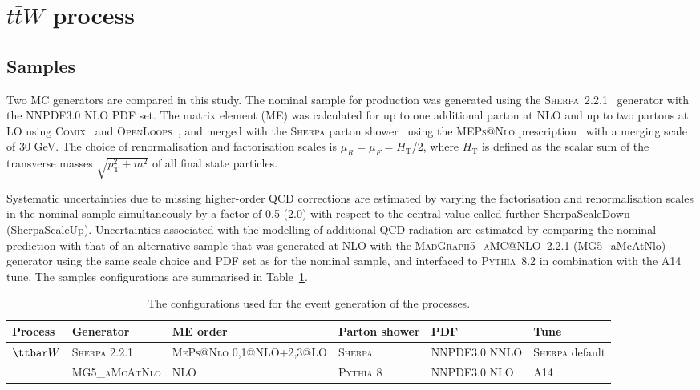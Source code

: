 \section{$t\bar{t}W$ process}
\label{sec:ttV}


\subsection{Samples}
Two MC generators are compared in this study.
The nominal sample for \ttW production was generated using the \textsc{Sherpa}~2.2.1~\cite{sherpa} generator with the NNPDF3.0 NLO PDF set. %
The matrix element (ME) was calculated for up to one additional parton at NLO and up to two partons at LO using
\textsc{Comix}~\cite{Gleisberg:2008fv} and \textsc{OpenLoops}~\cite{Cascioli:2011va}, and merged with the \textsc{Sherpa} parton shower~\cite{Schumann:2007mg} using the \textsc{MEPs@Nlo} prescription~\cite{Hoeche:2012yf} with a merging scale of 30 GeV.
The choice of renormalisation and factorisation scales is $\mu_R = \mu_F = H_\textrm{T}$/2, where $H_\textrm{T}$ is defined as the scalar sum of the transverse masses $\sqrt{p_\textrm{T}^2+m^2}$ of all final state particles.



Systematic uncertainties due to missing higher-order QCD corrections are estimated by varying the factorisation and renormalisation scales in the nominal sample simultaneously by a factor of 0.5 (2.0) with respect to the central value called further SherpaScaleDown (SherpaScaleUp). %
Uncertainties associated with the modelling of additional QCD radiation are estimated by comparing the nominal \ttW prediction with that of an alternative sample that was generated at NLO with the \textsc{MadGraph5\_aMC@NLO}~2.2.1 (MG5\_aMcAtNlo) generator using the same scale choice and PDF set as for the nominal sample, and interfaced to \textsc{Pythia}~8.2 in combination with the A14 tune. 
The samples configurations are summarised in Table~\ref{tab:mcconfig}.
\begin{table}
\begin{center}
\caption{\label{tab:mcconfig}
The configurations used for the event generation of the \ttW processes.}
\vspace{0.25cm}
{\small
\setlength\tabcolsep{1.5pt}
\begin{tabular}{llllll}
\hline\hline
Process & Generator & ME order & Parton shower & PDF & Tune  \\
\hline
$\ttbar W$  & \textsc{Sherpa 2.2.1} & \textsc{MePs@Nlo} 0,1@NLO+2,3@LO & \textsc{Sherpa} &  NNPDF3.0 NNLO & \textsc{Sherpa} default \\
& \textsc{MG5\_aMcAtNlo} & NLO & \textsc{Pythia} 8 & NNPDF3.0 NLO & A14   \\
\hline\hline
\end{tabular}
}
\end{center}
\end{table}


